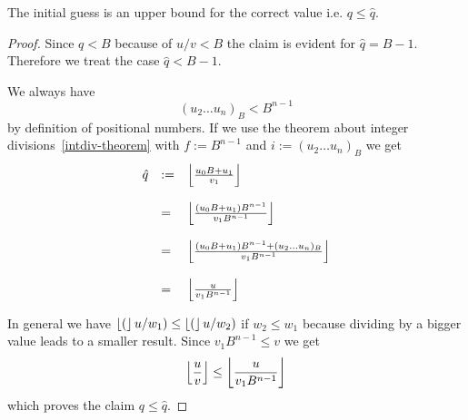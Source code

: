 \begin{theorem}
    The initial guess is an upper bound for the correct value i.e. $q \le
    \hat{q}$.

    \begin{proof}
        Since $q < B$ because of $u/v < B$ the claim is evident for $\hat{q} = B
        - 1$. Therefore we treat the case $\hat{q} < B - 1$.

        We always have
        $$
            (u_2 \ldots u_n)_B < B^{n-1}
        $$
        by definition of positional numbers. If we use the theorem about integer
        divisions~\ref{intdiv-theorem} with $f := B^{n-1}$ and $i := (u_2 \ldots
        u_n)_B$ we get
        $$
        \begin{array}{lll}
            \hat{q}
            &:=&
            \left\lfloor \frac{u_0 B + u_1}{v_1} \right\rfloor
            \\
            \\
            &=&
            \left\lfloor \frac{(u_0 B + u_1) B^{n-1}}{v_1 B^{n-1}} \right\rfloor
            \\
            \\
            &=&
            \left\lfloor \frac{(u_0 B + u_1) B^{n-1} + (u_2 \ldots u_n)_B}{v_1 B^{n-1}} \right\rfloor
            \\
            \\
            &=&
            \left\lfloor \frac{u}{v_1 B^{n-1}} \right\rfloor
        \end{array}
        $$

        In general we have $\left\lfloor ( \right\rfloor u / w_1) \le \left\lfloor ( \right\rfloor u / w_2)$ if $w_2 \le
        w_1$ because dividing by a bigger value leads to a smaller result. Since
        $v_1 B^{n-1} \le v$ we get
        $$
            \left\lfloor \frac{u}{v} \right\rfloor \le \left\lfloor \frac{u}{v_1 B^{n-1}} \right\rfloor
        $$
        which proves the claim $q \le \hat{q}$.
    \end{proof}
\end{theorem}
